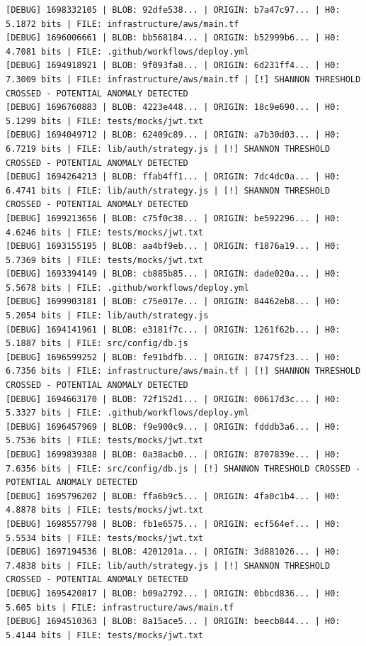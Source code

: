 \documentclass[12pt, a4paper, oneside]{report}
\begin{document}
\begin{lstlisting}[basicstyle=\tiny\ttfamily]
[DEBUG] 1698332105 | BLOB: 92dfe538... | ORIGIN: b7a47c97... | H0: 5.1872 bits | FILE: infrastructure/aws/main.tf
[DEBUG] 1696006661 | BLOB: bb568184... | ORIGIN: b52999b6... | H0: 4.7081 bits | FILE: .github/workflows/deploy.yml
[DEBUG] 1694918921 | BLOB: 9f093fa8... | ORIGIN: 6d231ff4... | H0: 7.3009 bits | FILE: infrastructure/aws/main.tf | [!] SHANNON THRESHOLD CROSSED - POTENTIAL ANOMALY DETECTED
[DEBUG] 1696760883 | BLOB: 4223e448... | ORIGIN: 18c9e690... | H0: 5.1299 bits | FILE: tests/mocks/jwt.txt
[DEBUG] 1694049712 | BLOB: 62409c89... | ORIGIN: a7b30d03... | H0: 6.7219 bits | FILE: lib/auth/strategy.js | [!] SHANNON THRESHOLD CROSSED - POTENTIAL ANOMALY DETECTED
[DEBUG] 1694264213 | BLOB: ffab4ff1... | ORIGIN: 7dc4dc0a... | H0: 6.4741 bits | FILE: lib/auth/strategy.js | [!] SHANNON THRESHOLD CROSSED - POTENTIAL ANOMALY DETECTED
[DEBUG] 1699213656 | BLOB: c75f0c38... | ORIGIN: be592296... | H0: 4.6246 bits | FILE: tests/mocks/jwt.txt
[DEBUG] 1693155195 | BLOB: aa4bf9eb... | ORIGIN: f1876a19... | H0: 5.7369 bits | FILE: tests/mocks/jwt.txt
[DEBUG] 1693394149 | BLOB: cb885b85... | ORIGIN: dade020a... | H0: 5.5678 bits | FILE: .github/workflows/deploy.yml
[DEBUG] 1699903181 | BLOB: c75e017e... | ORIGIN: 84462eb8... | H0: 5.2054 bits | FILE: lib/auth/strategy.js
[DEBUG] 1694141961 | BLOB: e3181f7c... | ORIGIN: 1261f62b... | H0: 5.1887 bits | FILE: src/config/db.js
[DEBUG] 1696599252 | BLOB: fe91bdfb... | ORIGIN: 87475f23... | H0: 6.7356 bits | FILE: infrastructure/aws/main.tf | [!] SHANNON THRESHOLD CROSSED - POTENTIAL ANOMALY DETECTED
[DEBUG] 1694663170 | BLOB: 72f152d1... | ORIGIN: 00617d3c... | H0: 5.3327 bits | FILE: .github/workflows/deploy.yml
[DEBUG] 1696457969 | BLOB: f9e900c9... | ORIGIN: fdddb3a6... | H0: 5.7536 bits | FILE: tests/mocks/jwt.txt
[DEBUG] 1699839388 | BLOB: 0a38acb0... | ORIGIN: 8707839e... | H0: 7.6356 bits | FILE: src/config/db.js | [!] SHANNON THRESHOLD CROSSED - POTENTIAL ANOMALY DETECTED
[DEBUG] 1695796202 | BLOB: ffa6b9c5... | ORIGIN: 4fa0c1b4... | H0: 4.8878 bits | FILE: tests/mocks/jwt.txt
[DEBUG] 1698557798 | BLOB: fb1e6575... | ORIGIN: ecf564ef... | H0: 5.5534 bits | FILE: tests/mocks/jwt.txt
[DEBUG] 1697194536 | BLOB: 4201201a... | ORIGIN: 3d881026... | H0: 7.4838 bits | FILE: lib/auth/strategy.js | [!] SHANNON THRESHOLD CROSSED - POTENTIAL ANOMALY DETECTED
[DEBUG] 1695420817 | BLOB: b09a2792... | ORIGIN: 0bbcd836... | H0: 5.605 bits | FILE: infrastructure/aws/main.tf
[DEBUG] 1694510363 | BLOB: 8a15ace5... | ORIGIN: beecb844... | H0: 5.4144 bits | FILE: tests/mocks/jwt.txt

\end{lstlisting}
\end{document}
